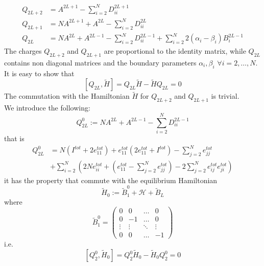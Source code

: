 \documentclass[11pt]{article}
\numberwithin{equation}{section}
\numberwithin{equation}{subsection}
\begin{document}
\begin{align}
	Q_{2L+2}&=A^{2L+1}-\sum_{i=2}^{N}D_{ii}^{2L+1}\\
	Q_{2L+1}&=NA^{2L+1}+A^{2L}-\sum_{i=2}^{N}D_{ii}^{2L}\\
	Q_{2L\phantom{+}}&=NA^{2L}+A^{2L-1}-\sum_{i=2}^{N}D_{ii}^{2L-1}+\sum_{i=2}^{N}2(\alpha_{i}-\beta_{i})B_{i}^{2L-1}
\end{align}
The charges $Q_{2L+2}$ and $Q_{2L+1}$ are proportional to the identity matrix, while $Q_{2L}$ contains non diagonal matrices and the boundary parameters $\alpha_{i},\beta_{i}$ $\forall i=2,\ldots,N$.\\
It is easy to show that 
\begin{equation}
	\left[Q_{2L},\widetilde{H}\right]=Q_{2L}\widetilde{H}-\widetilde{H}Q_{2L}=0
\end{equation}
The commutation with the Hamiltonian $\widetilde{H}$ for $Q_{2L+2}$ and $Q_{2L+1}$ is trivial. \\
We introduce the following:
\begin{equation}
Q_{2L}^{0}:=NA^{2L}+A^{2L-1}-\sum_{i=2}^{N}D_{ii}^{2L-1}
\end{equation}
that is 
\begin{equation}
\begin{split}
Q_{2L}^{0}&=N\left(I^{tot}+2e_{11}^{tot}\right)+e_{11}^{tot}(2e_{11}^{tot}+I^{tot})-\sum_{j=2}^{N}e_{jj}^{tot}
\\&
+\sum_{i=2}^{N}\left(	2Ne_{ii}^{tot}+\left(e_{11}^{tot}-\sum_{j=2}^{N}e_{jj}^{tot}\right)-2\sum_{j=2}^{N}e_{ij}^{tot}e_{ji}^{tot}\right)
\end{split}
\end{equation}
it has the property that commute with the equilibrium Hamiltonian
\begin{equation}
\widetilde{H}_{0}:=\widetilde{B}_{1}^{0}+\mathcal{H}+\widetilde{B}_{L}
\end{equation}
where 
\begin{equation}
\widetilde{B}_{1}^{0}=\begin{pmatrix}
0&0&\ldots&0\\
0&-1&\ldots&0\\
\vdots&\vdots&\ddots&\vdots\\
0&0&\ldots&-1
\end{pmatrix}
\end{equation}
i.e.
\begin{equation}
\left[Q_{2}^{0},\widetilde{H}_{0}\right]=Q_{2}^{0}\widetilde{H}_{0}-\widetilde{H}_{0}Q_{2}^{0}=0
\end{equation}
\end{document}
